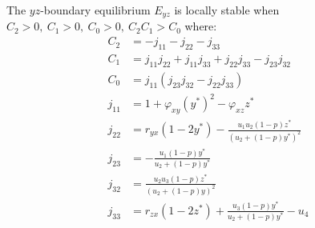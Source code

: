 \begin{theorem}\label{thm:boundary-yz-stability}
    The $yz$-boundary equilibrium $E_{yz}$ is locally stable when $C_2>0,\ C_1>0,\ C_0>0,\ C_2C_1>C_0$ where:
    \begin{align*}
        C_2 &= -j_{11}-j_{22}-j_{33}\\
        C_1 &= j_{11}j_{22}+j_{11}j_{33}+j_{22}j_{33}-j_{23}j_{32}\\
        C_0 &= j_{11}\left(j_{23}j_{32}-j_{22}j_{33}\right)\\
        j_{11} &= 1+\varphi_{xy}\left(y^*\right)^2-\varphi_{xz}z^*\\
        j_{22} &= r_{yx}\left(1-2y^*\right)-\frac{u_1u_2\left(1-p\right)z^*}{\left(u_2+\left(1-p\right)y^*\right)^2}\\
        j_{23} &= -\frac{u_1\left(1-p\right)y^*}{u_2+\left(1-p\right)y^*}\\
        j_{32} &= \frac{u_2u_3\left(1-p\right)z^*}{\left(u_2+\left(1-p\right)y\right)^2}\\
        j_{33} &= r_{zx}\left(1-2z^*\right)+\frac{u_3\left(1-p\right)y^*}{u_2+\left(1-p\right)y^*}-u_4
    \end{align*}
\end{theorem}
